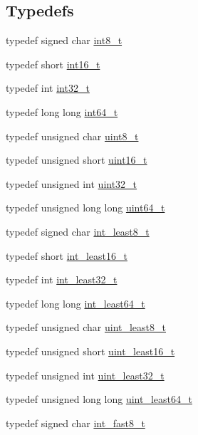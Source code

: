 \subsection*{Typedefs}
\begin{DoxyCompactItemize}
\item 
typedef signed char \hyperlink{stdint_8h_aef44329758059c91c76d334e8fc09700}{int8\-\_\-t}
\item 
typedef short \hyperlink{stdint_8h_aa343fa3b3d06292b959ffdd4c4703b06}{int16\-\_\-t}
\item 
typedef int \hyperlink{stdint_8h_a32f2e37ee053cf2ce8ca28d1f74630e5}{int32\-\_\-t}
\item 
typedef long long \hyperlink{stdint_8h_a996e72f71b11a5bb8b3b7b6936b1516d}{int64\-\_\-t}
\item 
typedef unsigned char \hyperlink{stdint_8h_aba7bc1797add20fe3efdf37ced1182c5}{uint8\-\_\-t}
\item 
typedef unsigned short \hyperlink{stdint_8h_a273cf69d639a59973b6019625df33e30}{uint16\-\_\-t}
\item 
typedef unsigned int \hyperlink{stdint_8h_a435d1572bf3f880d55459d9805097f62}{uint32\-\_\-t}
\item 
typedef unsigned long long \hyperlink{stdint_8h_aaa5d1cd013383c889537491c3cfd9aad}{uint64\-\_\-t}
\item 
typedef signed char \hyperlink{stdint_8h_ae04fa5ea5ad475bfe428842a986fbf28}{int\-\_\-least8\-\_\-t}
\item 
typedef short \hyperlink{stdint_8h_a8c0d77b4f3fb1570323a29b76f595742}{int\-\_\-least16\-\_\-t}
\item 
typedef int \hyperlink{stdint_8h_a647e80cea1327d7b1ccf0b2e1ebb1b53}{int\-\_\-least32\-\_\-t}
\item 
typedef long long \hyperlink{stdint_8h_a0bcb6217663641126e68e1b6073d0ce8}{int\-\_\-least64\-\_\-t}
\item 
typedef unsigned char \hyperlink{stdint_8h_ab0fdd2a9dc9606590ecccc0a5d8b5b7c}{uint\-\_\-least8\-\_\-t}
\item 
typedef unsigned short \hyperlink{stdint_8h_ad35c16792d2d094c16ced72bcf2cf5f6}{uint\-\_\-least16\-\_\-t}
\item 
typedef unsigned int \hyperlink{stdint_8h_a9a3e3b9785e918fb2c7d964efebd2130}{uint\-\_\-least32\-\_\-t}
\item 
typedef unsigned long long \hyperlink{stdint_8h_aa0a849a38a30b7a97df64232ca3f7cb3}{uint\-\_\-least64\-\_\-t}
\item 
typedef signed char \hyperlink{stdint_8h_afa981e0352f65c207364c9cb82246b53}{int\-\_\-fast8\-\_\-t}

\end{DoxyCompactItemize}
